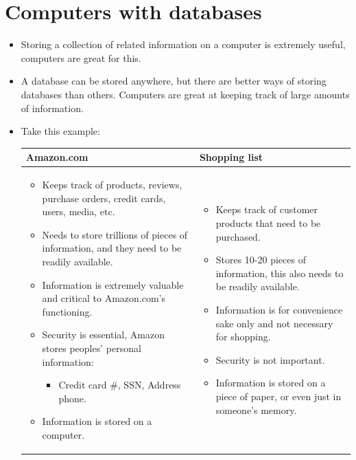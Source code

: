 \section{Computers with databases}
\begin{itemize}
    \item Storing a collection of related information on a computer is extremely useful, computers are great for this.
    \item A database can be stored anywhere, but there are better ways of storing databases than others. Computers are great at keeping track of large amounts of information.
    \item Take this example:
        \begin{center}
            \begin{tabular}{ |p{7cm}|p{7cm}| }
                \hline
                    Amazon.com & Shopping list \\
                \hline
                    {\begin{itemize}
                        \item Keeps track of products, reviews, purchase orders, credit cards, users, media, etc.
                        \item Needs to store trillions of pieces of information, and they need to be readily available.
                        \item Information is extremely valuable and critical to Amazon.com's functioning.
                        \item Security is essential, Amazon stores peoples' personal information:
                            \begin{itemize}
                                \item Credit card \#, SSN, Address phone.
                            \end{itemize}
                        \item Information is stored on a computer.
                    \end{itemize}}
                    & 
                    {\begin{itemize}
                        \item Keeps track of customer products that need to be purchased.
                        \item Stores 10-20 pieces of information, this also needs to be readily available.
                        \item Information is for convenience sake only and not necessary for shopping.
                        \item Security is not important.
                        \item Information is stored on a piece of paper, or even just in someone's memory.
                    \end{itemize}}
                    \\ 
                \hline
            \end{tabular}
        \end{center}
\end{itemize}

